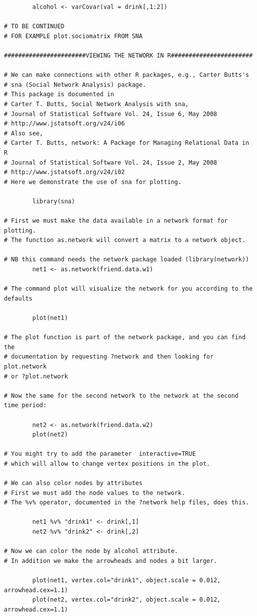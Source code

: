\documentclass[a4paper,fleqn]{article}
\newcommand{\+}{\, + \,}
\begin{document}
{\begin{verbatim}
        alcohol <- varCovar(val = drink[,1:2])

# TO BE CONTINUED
# FOR EXAMPLE plot.sociomatrix FROM SNA

#######################VIEWING THE NETWORK IN R#######################

# We can make connections with other R packages, e.g., Carter Butts's
# sna (Social Network Analysis) package.
# This package is documented in
# Carter T. Butts, Social Network Analysis with sna,
# Journal of Statistical Software Vol. 24, Issue 6, May 2008
# http://www.jstatsoft.org/v24/i06
# Also see,
# Carter T. Butts, network: A Package for Managing Relational Data in R
# Journal of Statistical Software Vol. 24, Issue 2, May 2008
# http://www.jstatsoft.org/v24/i02
# Here we demonstrate the use of sna for plotting.

        library(sna)

# First we must make the data available in a network format for plotting.
# The function as.network will convert a matrix to a network object.

# NB this command needs the network package loaded (library(network))
        net1 <- as.network(friend.data.w1)

# The command plot will visualize the network for you according to the defaults

        plot(net1)

# The plot function is part of the network package, and you can find the
# documentation by requesting ?network and then looking for plot.network
# or ?plot.network

# Now the same for the second network to the network at the second time period:

        net2 <- as.network(friend.data.w2)
        plot(net2)

# You might try to add the parameter  interactive=TRUE
# which will allow to change vertex positions in the plot.

# We can also color nodes by attributes
# First we must add the node values to the network.
# The %v% operator, documented in the ?network help files, does this.

        net1 %v% "drink1" <- drink[,1]
        net2 %v% "drink2" <- drink[,2]

# Now we can color the node by alcohol attribute.
# In addition we make the arrowheads and nodes a bit larger.

        plot(net1, vertex.col="drink1", object.scale = 0.012, arrowhead.cex=1.1)
        plot(net2, vertex.col="drink2", object.scale = 0.012, arrowhead.cex=1.1)


\end{verbatim}}
\end{document}
